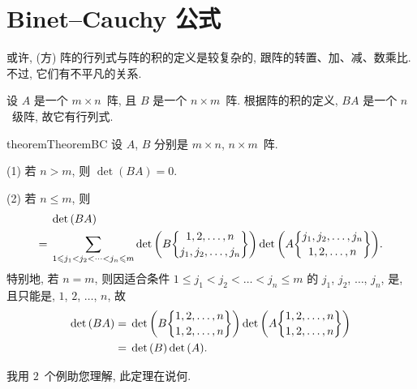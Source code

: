 \documentclass[../libro.tex]{subfiles}
\begin{document}

\KunAsteriskoEnEnhavtabelo
\section{Binet--Cauchy 公式}
\SenAsteriskoEnEnhavtabelo

\maldevigalegajxo

或许, (方) 阵的行列式与阵的积的定义是较复杂的,
跟阵的转置、加、减、数乘比.
不过, 它们有不平凡的关系.

设 \(A\) 是一个 \(m \times n\)~阵,
且 \(B\) 是一个 \(n \times m\)~阵.
根据阵的积的定义,
\(BA\) 是一个 \(n\)~级阵,
故它有行列式.

\begin{restatable}{theorem}{TheoremBC}
    设 \(A\), \(B\) 分别是 \(m \times n\), \(n \times m\)~阵.

    (1)
    若 \(n > m\), 则 \(\det {(BA)} = 0\).

    (2)
    若 \(n \leq m\),
    则
    \begin{align*}
        & \det {(BA)}
        \\
        = {} & \sum_{1 \leq j_1 < j_2 < \dots < j_n \leq m}
        {
            \det {\left(
                    B\submat{1, 2, \dots, n}{j_1, j_2, \dots, j_n}
            \right)}
            \det {\left(
                    A\submat{j_1, j_2, \dots, j_n}{1, 2, \dots, n}
            \right)}
        }.
    \end{align*}
    特别地, 若 \(n = m\), 则因适合条件
    \(1 \leq j_1 < j_2 < \dots < j_n \leq m\)
    的 \(j_1\), \(j_2\), \(\dots\), \(j_n\),
    是, 且只能是,
    \(1\), \(2\), \(\dots\), \(n\),
    故
    \begin{align*}
        \det {(BA)}
        = {} &
        \det {\left(
                B\submat{1, 2, \dots, n}{1, 2, \dots, n}
        \right)}
        \det {\left(
                A\submat{1, 2, \dots, n}{1, 2, \dots, n}
        \right)}
        \\
        = {} & \det {(B)} \det {(A)}.
    \end{align*}
\end{restatable}

我用 \(2\)~个例助您理解, 此定理在说何.
\end{document}
